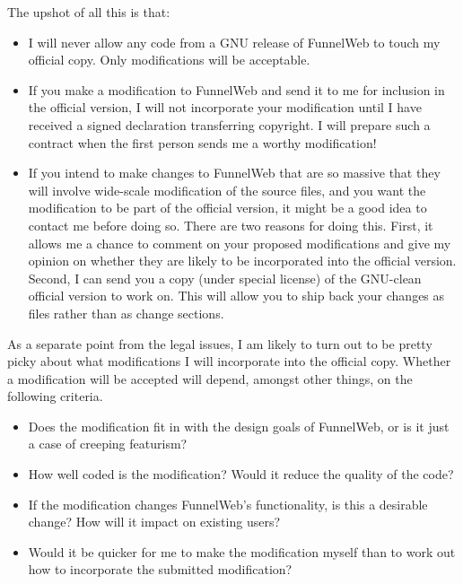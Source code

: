 The upshot of all this is that:

\begin{itemize}

\item I will never allow any code from a GNU release of FunnelWeb to
touch my official copy. Only modifications will be acceptable.

\item If you make a modification to FunnelWeb and send it to me for
inclusion in the official version, I will not incorporate your
modification until I have received a signed declaration transferring copyright.
I will prepare such a contract when the first person sends me a worthy
modification!

\item If you intend to make changes to FunnelWeb that are so massive that they
will involve wide-scale modification of the source files, and you want
the modification to be part of the official version,
it might be a good idea to contact me before doing so. There are two
reasons for doing this. First, it allows me a chance to comment on your
proposed modifications and give my opinion on whether they are likely to be
incorporated into the official version. Second, I can send you a copy
(under special license) of the GNU-clean official version to work on. This will
allow you to ship back your changes as files rather than as change sections.

\end{itemize}

As a separate point from the legal issues, I am likely to turn out to be
pretty picky about what modifications I will incorporate into the
official copy. Whether a modification will be accepted will depend,
amongst other things, on the following criteria.

\begin{itemize}

\item Does the modification fit in with the design goals of FunnelWeb, or
is it just a case of creeping featurism?

\item How well coded is the modification? Would it reduce the quality of the
code?

\item If the modification changes FunnelWeb's functionality, is this a
desirable change? How will it impact on existing users?

\item Would it be quicker for me to make the modification myself than
to work out how to incorporate the submitted modification?

\end{itemize}

